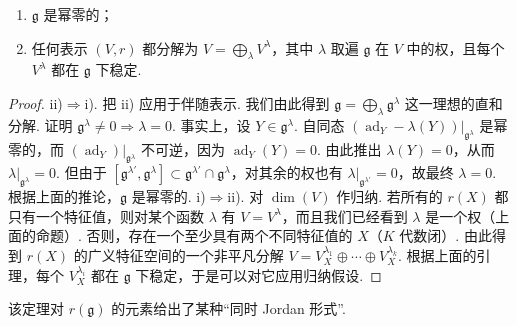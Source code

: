 \begin{numpara}[表示论刻画]
\begin{theorem*}
\begin{enumerate}[label=\roman*)]
\item $\mathfrak g$ 是幂零的；
\item 任何表示 $(V,r)$ 都分解为 $V=\bigoplus_{\lambda}V^{\lambda}$，其中 $\lambda$ 取遍 $\mathfrak g$ 在 $V$ 中的权，且每个 $V^{\lambda}$ 都在 $\mathfrak g$ 下稳定.
\end{enumerate}
\end{theorem*}
\begin{proof}
ii)$\Rightarrow$i). 把 ii) 应用于伴随表示. 我们由此得到 $\mathfrak g=\bigoplus_{\lambda}\mathfrak g^{\lambda}$ 这一理想的直和分解. 证明 $\mathfrak g^{\lambda}\neq 0\Rightarrow\lambda=0$. 事实上，设 $Y\in\mathfrak g^{\lambda}$. 自同态 $(\operatorname{ad}_{Y}-\lambda(Y))|_{\mathfrak g^{\lambda}}$ 是幂零的，而 $(\operatorname{ad}_{Y})|_{\mathfrak g^{\lambda}}$ 不可逆，因为 $\operatorname{ad}_{Y}(Y)=0$. 由此推出 $\lambda(Y)=0$，从而 $\lambda|_{\mathfrak g^{\lambda}}=0$. 但由于 $[\mathfrak g^{\lambda'},\mathfrak g^{\lambda}]\subset\mathfrak g^{\lambda'}\cap\mathfrak g^{\lambda}$，对其余的权也有 $\lambda|_{\mathfrak g^{\lambda'}}=0$，故最终 $\lambda=0$. 根据上面的推论，$\mathfrak g$ 是幂零的.
i)$\Rightarrow$ii). 对 $\dim(V)$ 作归纳. 若所有的 $r(X)$ 都只有一个特征值，则对某个函数 $\lambda$ 有 $V=V^{\lambda}$，而且我们已经看到 $\lambda$ 是一个权（上面的命题）. 否则，存在一个至少具有两个不同特征值的 $X$（$K$ 代数闭）. 由此得到 $r(X)$ 的广义特征空间的一个非平凡分解 $V=V_{X}^{\lambda_{1}}\oplus\cdots\oplus V_{X}^{\lambda_{k}}$. 根据上面的引理，每个 $V_{X}^{\lambda_{i}}$ 都在 $\mathfrak g$ 下稳定，于是可以对它应用归纳假设.
\end{proof}
\begin{remark*}
该定理对 $r(\mathfrak g)$ 的元素给出了某种``同时 Jordan 形式''.
\end{remark*}
\end{numpara}
